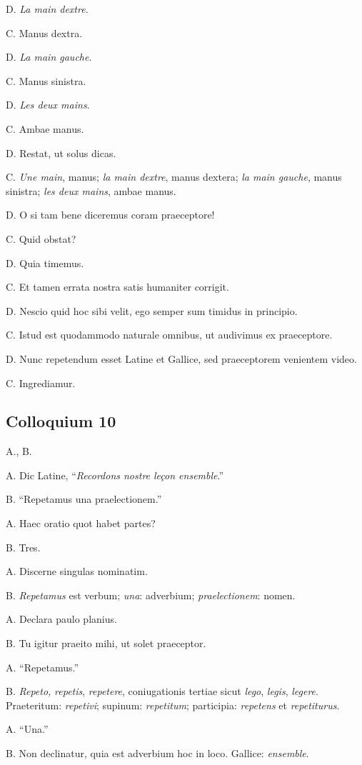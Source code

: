 \documentclass{article}
\newcommand{\fr}[1]{\foreignlanguage{french}{\emph{#1}}}
\begin{document}
D. \fr{La main dextre}.

C. Manus dextra.

D. \fr{La main gauche}.

C. Manus sinistra.

D. \fr{Les deux mains}.

C. Ambae manus.

D. Restat, ut solus dicas.

C. \fr{Une main}, manus; \fr{la main dextre}, manus dextera; \fr{la main gauche}, manus sinistra; \fr{les deux mains}, ambae manus.

D. O si tam bene diceremus coram praeceptore!

C. Quid obstat?

D. Quia timemus.

C. Et tamen errata nostra satis humaniter corrigit.

D. Nescio quid hoc sibi velit, ego semper sum timidus in principio.

C. Istud est quodammodo naturale omnibus, ut audivimus ex praeceptore.

D. Nunc repetendum esset Latine et Gallice, sed praeceptorem venientem video.

C. Ingrediamur.

\subsection{Colloquium 10}
A., B.

A. Dic Latine, ``\fr{Recordons nostre leçon ensemble}.''

B. ``Repetamus una praelectionem.''

A. Haec oratio quot habet partes?

B. Tres.

A. Discerne singulas nominatim.

B. \emph{Repetamus} est verbum; \emph{una}: adverbium; \emph{praelectionem}: nomen.

A. Declara paulo planius.

B. Tu igitur praeito mihi, ut solet praeceptor.

A. ``Repetamus.''

B. \emph{Repeto,} \emph{repetis}, \emph{repetere}, coniugationis tertiae sicut \emph{lego}, \emph{legis}, \emph{legere}. Praeteritum: \emph{repetivi}; supinum: \emph{repetitum}; participia: \emph{repetens} et \emph{repetiturus}.

A. ``Una.''

B. Non declinatur, quia est adverbium hoc in loco. Gallice: \fr{ensemble}.
\end{document}
